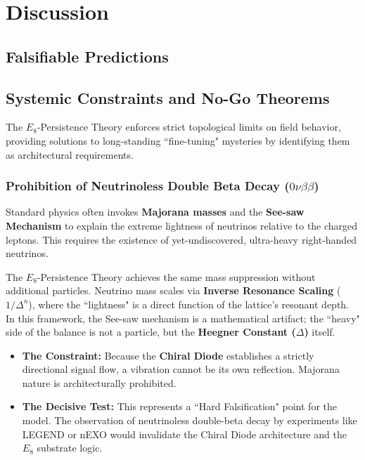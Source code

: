 \section{Discussion}

\subsection{Falsifiable Predictions}


\subsection{Systemic Constraints and No-Go Theorems}

The $E_8$-Persistence Theory enforces strict topological limits on field behavior, providing solutions to long-standing ``fine-tuning" mysteries by identifying them as architectural requirements.

\subsubsection{Prohibition of Neutrinoless Double Beta Decay (\texorpdfstring{$0\nu\beta\beta$}{0nubetabeta})}

Standard physics often invokes \textbf{Majorana masses} and the \textbf{See-saw Mechanism} to explain the extreme lightness of neutrinos relative to the charged leptons. This requires the existence of yet-undiscovered, ultra-heavy right-handed neutrinos.

The $E_8$-Persistence Theory achieves the same mass suppression without additional particles. Neutrino mass scales via \textbf{Inverse Resonance Scaling} ($1/\Delta^n$), where the ``lightness" is a direct function of the lattice's resonant depth. In this framework, the See-saw mechanism is a mathematical artifact; the ``heavy" side of the balance is not a particle, but the \textbf{Heegner Constant ($\Delta$)} itself.

\begin{itemize}
    \item \textbf{The Constraint:} Because the \textbf{Chiral Diode} establishes a strictly directional signal flow, a vibration cannot be its own reflection. Majorana nature is architecturally prohibited.
    \item \textbf{The Decisive Test:} This represents a ``Hard Falsification" point for the model. The observation of neutrinoless double-beta decay by experiments like LEGEND or nEXO would invalidate the Chiral Diode architecture and the $E_8$ substrate logic.
\end{itemize}

